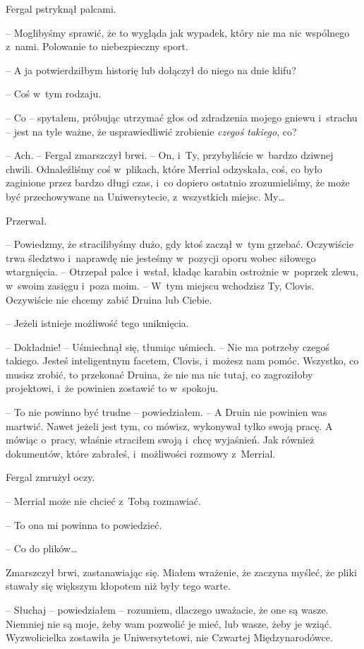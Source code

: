 \documentclass[oneside,polish,11pt,sfheadings]{mwbk}
\begin{document}
Fergal pstryknął palcami. 

-- Moglibyśmy sprawić, że to wygląda jak
wypadek, który nie ma nic wspólnego z~nami. Polowanie to niebezpieczny
sport.

-- A ja potwierdziłbym historię lub dołączył do niego na dnie klifu?

-- Coś w~tym rodzaju.

-- Co -- spytałem, próbując utrzymać głos od zdradzenia mojego gniewu i~strachu -- jest na tyle ważne, że usprawiedliwić zrobienie \textit{czegoś
takiego}, co?

-- Ach. -- Fergal zmarszczył brwi. -- On, i~Ty, przybyliście w~bardzo
dziwnej chwili. Odnaleźliśmy coś w~plikach, które Merrial odzyskała,
coś, co było zaginione przez bardzo długi czas, i~co dopiero ostatnio
zrozumieliśmy, że może być przechowywane na Uniwersytecie, z~wszystkich
miejsc. My\ldots

Przerwał. 

-- Powiedzmy, że stracilibyśmy dużo, gdy ktoś zaczął w~tym
grzebać. Oczywiście trwa śledztwo i~naprawdę nie jesteśmy w~pozycji
oporu wobec siłowego wtargnięcia. -- Otrzepał palce i~wstał, kładąc
karabin ostrożnie w~poprzek zlewu, w~swoim zasięgu i~poza moim. -- W~tym
miejscu wchodzisz Ty, Clovis. Oczywiście nie chcemy zabić Druina lub
Ciebie.

-- Jeżeli istnieje możliwość tego uniknięcia.

-- Dokładnie! -- Uśmiechnął się, tłumiąc uśmiech. -- Nie ma potrzeby czegoś
takiego. Jesteś inteligentnym facetem, Clovis, i~możesz nam pomóc.
Wszystko, co musisz zrobić, to przekonać Druina, że nie ma nic tutaj, co
zagroziłoby projektowi, i~że powinien zostawić to w~spokoju.

-- To nie powinno być trudne -- powiedziałem. -- A Druin nie powinien was
martwić. Nawet jeżeli jest tym, co mówisz, wykonywał tylko swoją pracę.
A mówiąc o~pracy, właśnie straciłem swoją i~chcę wyjaśnień. Jak również
dokumentów, które zabrałeś, i~możliwości rozmowy z~Merrial.

Fergal zmrużył oczy. 

-- Merrial może nie chcieć z~Tobą rozmawiać.

-- To ona mi powinna to powiedzieć.

-- Co do plików\ldots

Zmarszczył brwi, zastanawiając się. Miałem wrażenie, że zaczyna myśleć,
że pliki stawały się większym kłopotem niż były tego warte.

-- Słuchaj -- powiedziałem -- rozumiem, dlaczego uważacie, że one są wasze.
Niemniej nie są moje, żeby wam pozwolić je mieć, lub wasze, żeby je
wziąć. Wyzwolicielka zostawiła je Uniwersytetowi, nie Czwartej
Międzynarodówce.
\end{document}
